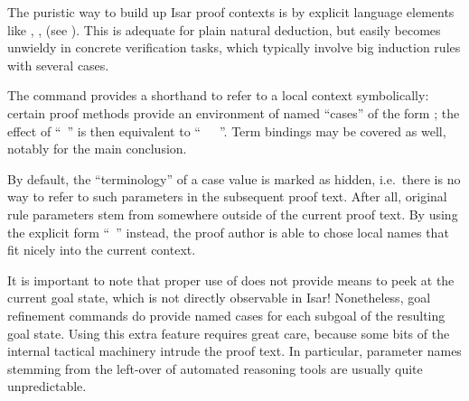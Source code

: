 \begin{isabellebody}
\begin{isamarkuptext}
  The puristic way to build up Isar proof contexts is by explicit
  language elements like \mbox{}, \mbox{},
  \mbox{} (see ).  This is adequate
  for plain natural deduction, but easily becomes unwieldy in concrete
  verification tasks, which typically involve big induction rules with
  several cases.

  The \mbox{} command provides a shorthand to refer to a
  local context symbolically: certain proof methods provide an
  environment of named ``cases'' of the form ; the effect of ``\mbox{}~'' is then equivalent to ``\mbox{}~~\mbox{}~''.  Term bindings may be covered as well, notably
  \mbox{} for the main conclusion.

  By default, the ``terminology''  of
  a case value is marked as hidden, i.e.\ there is no way to refer to
  such parameters in the subsequent proof text.  After all, original
  rule parameters stem from somewhere outside of the current proof
  text.  By using the explicit form ``\mbox{}~'' instead, the proof author is able to
  chose local names that fit nicely into the current context.

  \medskip It is important to note that proper use of \mbox{} does not provide means to peek at the current goal state,
  which is not directly observable in Isar!  Nonetheless, goal
  refinement commands do provide named cases 
  for each subgoal  of the resulting goal state.
  Using this extra feature requires great care, because some bits of
  the internal tactical machinery intrude the proof text.  In
  particular, parameter names stemming from the left-over of automated
  reasoning tools are usually quite unpredictable.


\end{isamarkuptext}
\end{isabellebody}

